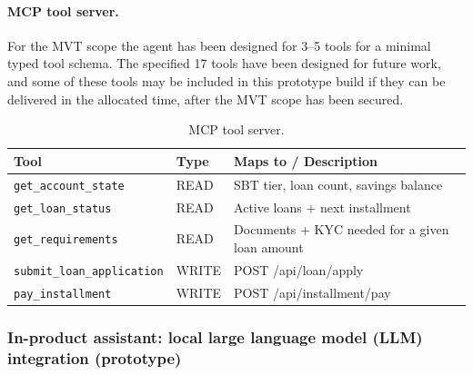 \documentclass[12pt,a4paper]{report}
\newcommand{\tableheadcolor}{\rowcolor{TableHeadBg}}
\begin{document}
\paragraph{MCP tool server.} For the MVT scope the agent has been designed for 3--5 tools for a minimal typed tool schema. The specified 17 tools have been designed for future work, and some of these tools may be included in this prototype build if they can be delivered in the allocated time, after the MVT scope has been secured.

\begin{table}[H]
\centering
\caption[MCP tool server]{MCP tool server.}
\label{tab:mcp-tools}
\begin{tabular}{p{4.8cm}p{1.4cm}p{6.3cm}}
\toprule
\tableheadcolor
\textbf{Tool} & \textbf{Type} & \textbf{Maps to / Description} \\
\midrule
\texttt{get\_account\_state}       & READ & SBT tier, loan count, savings balance \\
\texttt{get\_loan\_status}         & READ & Active loans + next installment \\
\texttt{get\_requirements}         & READ & Documents + KYC needed for a given loan amount \\
\texttt{submit\_loan\_application} & WRITE & POST /api/loan/apply \\
\texttt{pay\_installment}          & WRITE & POST /api/installment/pay \\
\bottomrule
\end{tabular}
\end{table}

\subsubsection{In-product assistant: local large language model (LLM) integration (prototype)}
\label{sec:local-llm}
\end{document}
